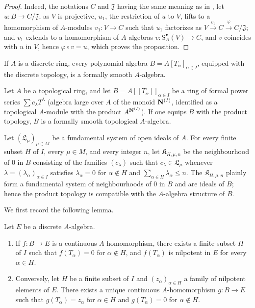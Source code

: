 \begin{proof}
Indeed, the notations $C$ and $\mathfrak{J}$ having the same meaning as in , let $u:B\to C/\mathfrak{J}$;
as $V$ is projective, $u_1$, the restriction of $u$ to $V$, lifts to a homomorphism of $A$-modules $v_1:V\to C$ such that $u_1$ factorizes as $V\xrightarrow{v_1}C\xrightarrow{\varphi}C/\mathfrak{J}$;
and $v_1$ extends to a homomorphism of $A$-algebras $v:\mathrm{S}_A^\bullet(V)\to C$, and $v$ coincides with $u$ in $V$, hence $\varphi\circ v=u$, which proves the proposition.
\end{proof}

\begin{corollary}[19.3.3]
\label{0.19.3.3}
If $A$ is a discrete ring, every polynomial algebra $B=A[T_\alpha]_{\alpha\in I}$, equipped with the discrete topology, is a formally smooth $A$-algebra.
\end{corollary}

\begin{proposition}[19.3.4]
\label{0.19.3.4}
Let $A$ be a topological ring, and let $B=A[[T_\alpha]]_{\alpha\in I}$ be a ring of formal power series $\sum c_\lambda T^\lambda$ (algebra large over $A$ of the monoid $\mathbf{N}^{(I)}$, identified as a topological $A$-module with the product $A^{\mathbf{N}^{(I)}}$).
If one equips $B$ with the product topology, $B$ is a formally smooth topological $A$-algebra.
\end{proposition}

Let $(\mathfrak{L}_\mu)_{\mu\in M}$ be a fundamental system of open ideals of $A$.
For every finite subset $H$ of $I$, every $\mu\in M$, and every integer $n$, let $\mathfrak{K}_{H,\mu,n}$ be the neighbourhood of $0$ in $B$ consisting of the families $(c_\lambda)$ such that $c_\lambda\in\mathfrak{L}_\mu$ whenever $\lambda=(\lambda_\alpha)_{\alpha\in I}$ satisfies $\lambda_\alpha=0$ for $\alpha\notin H$ and $\sum_{\alpha\in H}\lambda_\alpha\leq n$.
The $\mathfrak{K}_{H,\mu,n}$ plainly form a fundamental system of neighbourhoods of $0$ in $B$ and are ideals of $B$; hence the product topology is compatible with the $A$-algebra structure of $B$.

We first record the following lemma.

\begin{lemma}[19.3.4.1]
\label{0.19.3.4.1}
Let $E$ be a discrete $A$-algebra.
\begin{enumerate}
  \item[\rm(i)] If $f:B\to E$ is a continuous $A$-homomorphism, there exists a finite subset $H$ of $I$ such that $f(T_\alpha)=0$ for $\alpha\notin H$, and $f(T_\alpha)$ is nilpotent in $E$ for every $\alpha\in H$.
  \item[\rm(ii)] Conversely, let $H$ be a finite subset of $I$ and $(z_\alpha)_{\alpha\in H}$ a family of nilpotent elements of $E$.
  There exists a unique continuous $A$-homomorphism $g:B\to E$ such that $g(T_\alpha)=z_\alpha$ for $\alpha\in H$ and $g(T_\alpha)=0$ for $\alpha\notin H$.
\end{enumerate}
\end{lemma}

